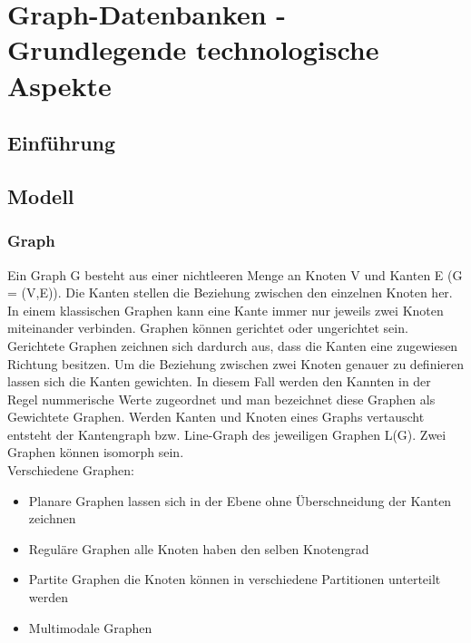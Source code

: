 \chapter{Graph-Datenbanken - Grundlegende technologische Aspekte}
\section{Einführung}
\section{Modell}
\subsection{Graph}
Ein Graph G besteht aus einer nichtleeren Menge an Knoten V und Kanten E (G = (V,E)).
Die Kanten stellen die Beziehung zwischen den einzelnen Knoten her.
In einem klassischen Graphen kann eine Kante immer nur jeweils zwei Knoten miteinander verbinden.
Graphen können gerichtet oder ungerichtet sein. Gerichtete Graphen zeichnen sich dardurch aus, dass die Kanten eine zugewiesen Richtung besitzen.
Um die Beziehung zwischen zwei Knoten genauer zu definieren lassen sich die Kanten gewichten.
In diesem Fall werden den Kannten in der Regel nummerische Werte zugeordnet und man bezeichnet diese Graphen als Gewichtete Graphen.
Werden Kanten und Knoten eines Graphs vertauscht entsteht der Kantengraph bzw. Line-Graph des jeweiligen Graphen L(G).
Zwei Graphen können isomorph sein.
\\Verschiedene Graphen:
\begin{itemize}
	\item Planare Graphen
	\subitem lassen sich in der Ebene ohne Überschneidung der Kanten zeichnen\cite{Theobald2016}
	\item Reguläre Graphen
	\subitem alle Knoten haben den selben Knotengrad
	\item Partite Graphen
	\subitem die Knoten können in verschiedene Partitionen unterteilt werden
	\item Multimodale Graphen
\end{itemize}

